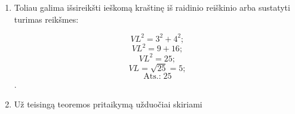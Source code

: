 \documentclass[a4paper]{article}
\begin{document}
\begin{enumerate}
\begin{enumerate}
\begin{minipage}{0.5\textwidth}
                        \end{minipage}

                  \item \parbox{0.65\textwidth}{
                              Toliau galima išsireikšti ieškomą kraštinę iš
                              raidinio reiškinio arba sustatyti turimas
                              reikšmes:
                        }

                              $$VL^{2}=3^{2}+4^{2};$$
                              $$VL^{2}=9+16;$$
                              $$VL^{2}=25;$$
                              $$VL=\sqrt{25}=5;$$
                              $$\text{Ats.:} \; 25$$.
                  \item Už teisingą teoremos pritaikymą užduočiai skiriami 
                        
            \end{enumerate}



\end{enumerate}
\end{document}
